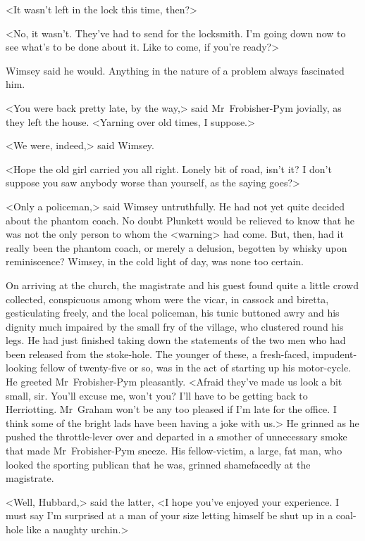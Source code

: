 <It wasn't left in the lock this time, then?>

<No, it wasn't. They've had to send for the locksmith. I'm going down now to see what's to be done about it. Like to come, if you're ready?>

Wimsey said he would. Anything in the nature of a problem always fascinated him.

<You were back pretty late, by the way,> said Mr~Frobisher-Pym jovially, as they left the house. <Yarning over old times, I suppose.>

<We were, indeed,> said Wimsey.

<Hope the old girl carried you all right. Lonely bit of road, isn't it? I don't suppose you saw anybody worse than yourself, as the saying goes?>

<Only a policeman,> said Wimsey untruthfully. He had not yet quite decided about the phantom coach. No doubt Plunkett would be relieved to know that he was not the only person to whom the <warning> had come. But, then, had it really been the phantom coach, or merely a delusion, begotten by whisky upon reminiscence? Wimsey, in the cold light of day, was none too certain.

On arriving at the church, the magistrate and his guest found quite a little crowd collected, conspicuous among whom were the vicar, in cassock and biretta, gesticulating freely, and the local policeman, his tunic buttoned awry and his dignity much impaired by the small fry of the village, who clustered round his legs. He had just finished taking down the statements of the two men who had been released from the stoke-hole. The younger of these, a fresh-faced, impudent-looking fellow of twenty-five or so, was in the act of starting up his motor-cycle. He greeted Mr~Frobisher-Pym pleasantly. <Afraid they've made us look a bit small, sir. You'll excuse me, won't you? I'll have to be getting back to Herriotting. Mr~Graham won't be any too pleased if I'm late for the office. I think some of the bright lads have been having a joke with us.> He grinned as he pushed the throttle-lever over and departed in a smother of unnecessary smoke that made Mr~Frobisher-Pym sneeze. His fellow-victim, a large, fat man, who looked the sporting publican that he was, grinned shamefacedly at the magistrate.

<Well, Hubbard,> said the latter, <I hope you've enjoyed your experience. I must say I'm surprised at a man of your size letting himself be shut up in a coal-hole like a naughty urchin.>

